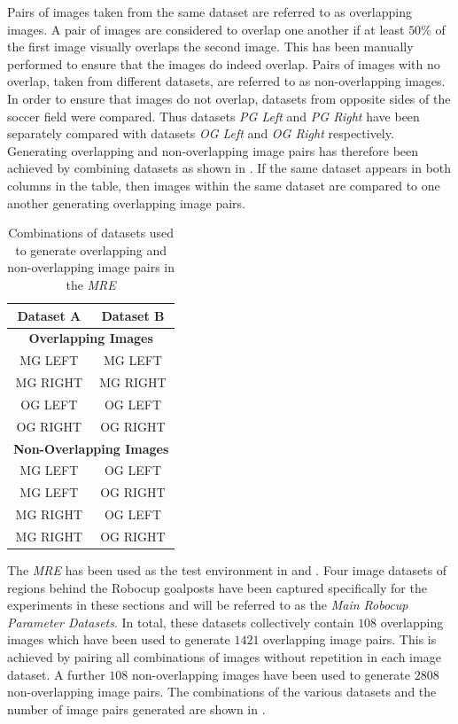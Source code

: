 \documentclass[11pt]{report}
\begin{document}
Pairs of images taken from the same dataset are referred to as overlapping images. A pair of images are considered to overlap one another if at least $50\%$ of the first image visually overlaps the second image. This has been manually performed to ensure that the images do indeed overlap. Pairs of images with no overlap, taken from different datasets, are referred to as non-overlapping images. In order to ensure that images do not overlap, datasets from opposite sides of the soccer field were compared. Thus datasets \textit{PG Left} and \textit{PG Right} have been separately compared with datasets \textit{OG Left} and \textit{OG Right} respectively. Generating overlapping and non-overlapping image pairs has therefore been achieved by combining datasets as shown in . If the same dataset appears in both columns in the table, then images within the same dataset are compared to one another generating overlapping image pairs. \\

\begin{table}
\caption{Combinations of datasets used to generate overlapping and non-overlapping image pairs in the \textit{MRE}}
\begin{tabular}{|c|c|}
\hline 
\textbf{Dataset A} & \textbf{Dataset B}\tabularnewline
\hline 
\hline 
\multicolumn{2}{|c|}{\textbf{Overlapping Images}}\tabularnewline
\hline 
MG LEFT & MG LEFT\tabularnewline
\hline 
MG RIGHT & MG RIGHT\tabularnewline
\hline 
OG LEFT & OG LEFT\tabularnewline
\hline 
OG RIGHT & OG RIGHT\tabularnewline
\hline 
\multicolumn{2}{|c|}{\textbf{Non-Overlapping Images}}\tabularnewline
\hline 
MG LEFT & OG LEFT\tabularnewline
\hline 
MG LEFT & OG RIGHT\tabularnewline
\hline 
MG RIGHT & OG LEFT\tabularnewline
\hline 
MG RIGHT & OG RIGHT\tabularnewline
\hline 
\end{tabular}
\label{table:overlap}
\end{table}

The \textit{MRE} has been used as the test environment in  and . Four image datasets of regions behind the Robocup goalposts have been captured specifically for the experiments in these sections and will be referred to as the \textit{Main Robocup Parameter Datasets}. In total, these datasets collectively contain $108$ overlapping images which have been used to generate $1421$ overlapping image pairs. This is achieved by pairing all combinations of images without repetition in each image dataset. A further $108$ non-overlapping images have been used to generate $2808$ non-overlapping image pairs. The combinations of the various datasets and the number of image pairs generated are shown in . \\
\end{document}
